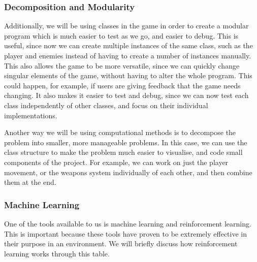 \subsubsection{Decomposition and Modularity}

Additionally, we will be using classes in the game in order to create a modular program which is much easier to test as we go, and easier to debug. This is useful, since now we can create multiple instances of the same class, such as the player and enemies instead of having to create a number of instances manually. This also allows the game to be more versatile, since we can quickly change singular elements of the game, without having to alter the whole program. This could happen, for example, if users are giving feedback that the game needs changing. It also makes it easier to test and debug, since we can now test each class independently of other classes, and focus on their individual implementations.

\vs
Another way we will be using computational methods is to decompose the problem into smaller, more manageable problems. In this case, we can use the class structure to make the problem much easier to visualise, and code small components of the project. For example, we can work on just the player movement, or the weapons system individually of each other, and then combine them at the end.

\vs
\subsubsection{Machine Learning}

One of the tools available to us is machine learning and reinforcement learning. This is important because these tools have proven to be extremely effective in their purpose in an environment. We will briefly discuss how reinforcement learning works through this table.

